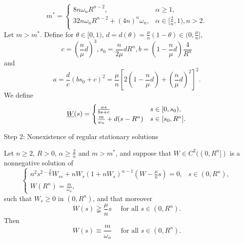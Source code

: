 \begin{frame}
	\begin{equation}\label{eq:m asterisk}
		m^\ast = \begin{cases}
			8n\omega_nR^{n-2}, & \alpha\geqslant1,\\	%
			32n\omega_nR^{n-2} + (4n)^n\omega_n, & \alpha\in[\frac2n, 1), n > 2.\\
			\end{cases}
	\end{equation}
 Let $m>m^\ast$.
Define for $\theta\in[0,1)$, $d=d(\theta)=\frac\mu{n}(1-\theta)\in(0,\frac\mu{n}],$
	\begin{equation}\label{parameter c b s}
	c = \left(\frac{n}{\mu}d\right)^3, s_0 = \frac{n}{2\mu}dR^n, b = \left(1 - \frac{n}{\mu}d\right)\frac4{R^n}
	\end{equation}
	 and
	\begin{equation}\label{parameter a}
		a= \frac{d}{c}(bs_0 + c)^2 = \frac{\mu}{n}\left[2\left(1-\frac{n}{\mu}d\right) + \left(\frac{n}{\mu}d\right)^2\right]^2.
	\end{equation}
	We define
	\begin{equation}\label{subsolution with parameter}
		\underline{W}(s) = 
		\begin{cases}
			\frac{as}{bs + c} & s\in[0, s_0),\\
			\frac{m}{\omega_n} + d(s - R^n) & s\in[s_0, R^n].\\
		\end{cases}
	\end{equation}

\end{frame}

\begin{frame}{Step 2: Nonexistence of regular stationary solutions}
\begin{lemma}\label{constant stationary solution}
	Let $n\geqslant2$, $R>0$, $\alpha\geqslant\frac2n$ and $m>m^*$, and suppose that $W\in C^2((0, R^n])$ is a nonnegative solution of 
\begin{equation}
	\label{one-point boundary value problem}
	\begin{cases}
		n^2s^{2-\frac2n}W_{ss} + nW_s(1 + nW_s)^{\alpha -1}\left(W - \frac{\mu}{n}s\right) = 0,& s\in(0,R^n),\\
		W(R^n) = \frac{m}{\omega_n}, &
	\end{cases}
\end{equation}
 such that $W_s\geqslant 0$ in $(0, R^n)$, and that moreover
	\begin{equation}\nonumber
		W(s)\gneqq\frac{\mu}{n}s \quad \text{ for all } s\in(0, R^n).
	\end{equation}
Then
	\begin{equation}\nonumber
		W(s) \equiv \frac m{\omega_n}\quad \text{ for all } s\in(0, R^n).
	\end{equation}
\end{lemma}
\end{frame}


